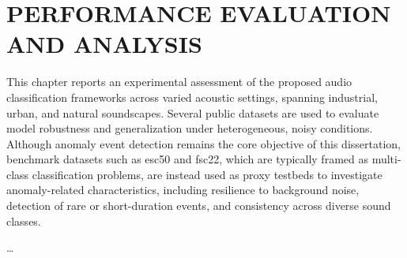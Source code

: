 \section{\MakeUppercase{Performance Evaluation and Analysis}}\label{chap:three}
This chapter reports an experimental assessment of the proposed audio classification frameworks across varied acoustic settings, spanning industrial, urban, and natural soundscapes. Several public datasets are used to evaluate model robustness and generalization under heterogeneous, noisy conditions. Although anomaly event detection remains the core objective of this dissertation, benchmark datasets such as \gls{esc50} and \gls{fsc22}, which are typically framed as multi-class classification problems, are instead used as proxy testbeds to investigate anomaly-related characteristics, including resilience to background noise, detection of rare or short-duration events, and consistency across diverse sound classes.

\dots



